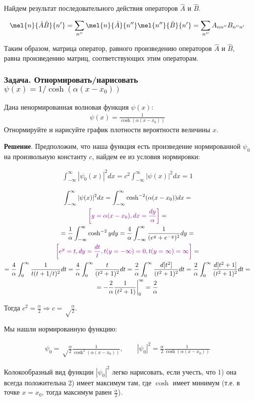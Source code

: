 Найдем результат последовательного действия операторов $\hat A$ и $\hat B$.

$$\mel{n}{\hat A \hat B}{n'}=\sum\limits_{n''}\mel{n}{\hat A}{n'' }\mel{n''}{\hat B}{n'} =\sum\limits_{n''}A_{nn''}B_{n''n'}$$

Таким образом, матрица оператор, равного произведению операторов $\hat A$ и $\hat B$, равна произведению матриц, соответствующих этим операторам.
\subsubsection{Задача. Отнормировать/нарисовать $\psi(x)=1/\cosh(\alpha(x-x_0))$}

Дана ненормированная волновая функция $\psi(x)$:
\begin{gather*}
\psi(x)=\frac{1}{\cosh(\alpha(x-x_0))}
\end{gather*}
Отнормируйте и нарисуйте график плотности вероятности величины $x$.

\textbf{Решение}. Предположим, что наша функция есть произведение нормированной $\psi_0$ на произвольную константу $c$, найдем ее из условия нормировки:

\begin{gather*}
\int_{-\infty}^{\infty}|\psi_0(x)|^2 dx=
c^2\int_{-\infty}^{\infty}|\psi(x)|^2 dx=1
\end{gather*}

\begin{gather*}
\int_{-\infty}^{\infty}|\psi(x)|^2 dx=
\int_{-\infty}^{\infty} \cosh^{-2}(\alpha(x-x_0)) dx=\\
\textcolor{violet}{\left[ y=\alpha(x-x_0), dx=\frac{dy}{\alpha}\right]}=\\=
\frac{1}{\alpha}\int_{-\infty}^{\infty} \cosh^{-2}y dy=
\frac{4}{\alpha}\int_{-\infty}^{\infty} \frac{1}{(e^y+e^{-y})^2}dy=\\
\textcolor{violet}{\left[ e^y=t, dy=\frac{dt}{t}, t(y=-\infty)=0, t(y=\infty)=\infty\right]}=\\=
%
\frac{4}{\alpha}\int_0^{\infty} \frac{1}{t(t+1/t)^2}dt=
\frac{4}{\alpha}\int_0^{\infty} \frac{t}{(t^2+1)^2}dt=
\frac{2}{\alpha}\int_0^{\infty} \frac{d[t^2]}{(t^2+1)^2}dt=
\frac{2}{\alpha}\int_0^{\infty} \frac{d[t^2+1]}{(t^2+1)^2}dt=\\=
-\frac{2}{\alpha}\frac{1}{(t^2+1)}\bigg|_{0}^{\infty}=
\frac{2}{\alpha}
\end{gather*}

Тогда  $c^2=\frac{\alpha}{2} \Rightarrow c=\sqrt\frac{\alpha}{2} $.

Мы нашли нормированную функцию:

\begin{gather*}
\psi_0=\sqrt\frac{\alpha}{2}\frac{1}{\cosh^2(\alpha(x-x_0))},\qquad
|\psi_0|^2=\frac{\alpha}{2}\frac{1}{\cosh(\alpha(x-x_0))}
\end{gather*}

Колокообразный вид функции $|\psi_0|^2$ легко нарисовать,  если учесть, что 1) она всегда положительна 2) имеет максимум там, где $\cosh$ имеет минимум (т.е. в точке $x=x_0$, тогда максимум равен $\frac{\alpha}{2}$).